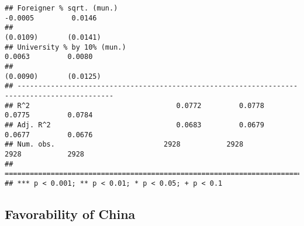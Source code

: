 \documentclass[
]{article}
\begin{document}
\begin{verbatim}
## Foreigner % sqrt. (mun.)                                           -0.0005         0.0146    
##                                                                    (0.0109)       (0.0141)   
## University % by 10% (mun.)                                          0.0063         0.0080    
##                                                                    (0.0090)       (0.0125)   
## ---------------------------------------------------------------------------------------------
## R^2                                   0.0772         0.0778         0.0775         0.0784    
## Adj. R^2                              0.0683         0.0679         0.0677         0.0676    
## Num. obs.                          2928           2928           2928           2928         
## =============================================================================================
## *** p < 0.001; ** p < 0.01; * p < 0.05; + p < 0.1
\end{verbatim}

\hypertarget{favorability-of-china-3}{%
\subsection{Favorability of China}\label{favorability-of-china-3}}
\end{document}
